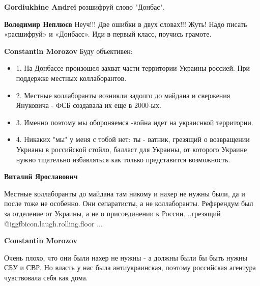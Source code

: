 \begin{itemize}
\begin{itemize}
\textbf{Gordiukhine Andrei} розшифруй слово "Донбас".

\textbf{Володимир Неплюєв}
Неуч!!! Две ошибки в двух словах!!! Жуть! Надо писать «расшифруй» и «Донбасс». Иди в первый класс, поучись грамоте.

\textbf{Constantin Morozov} Буду объективен:

\begin{itemize}
  \item 1. На Донбассе произошел захват части территории Украины россией. При поддержке местных коллаборантов.
  \item 2. Местные коллаборанты возникли задолго до майдана и свержения Януковича - ФСБ создавала их еще в 2000-ых.
  \item 3. Именно поэтому мы обороняемся -война идет на украиснкой территории.
  \item 4. Никаких "мы" у меня с тобой нет: ты - ватник, грезящий о возвращении Укрианы в российской стойло, балласт для Украины, от которого Украине нужно тщательно избавляться как только представится возможность.
\end{itemize}

\textbf{Виталий Ярославович} 

Местные коллаборанты до майдана там никому и нахер не нужны были, да и после
тоже не особенно. Они сепаратисты, а не коллаборанты. Референдум был за
отделение от Украины, а не о присоединении к России. ..грезящий
@igg{fbicon.laugh.rolling.floor}  ...

\textbf{Constantin Morozov} 

Очень плохо, что они были нахер не нужны - а должны были бы быть нужны СБУ и
СВР. Но власть у нас была антиукраинская, поэтому российская агентура
чувствовала себя как дома.

\end{itemize} %

\end{itemize} %

